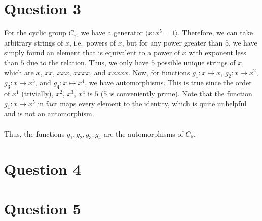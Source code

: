 \documentclass[letterpaper]{article}
\begin{document}
\section{Question 3}
\label{sec:Question3}

For the cyclic group $ C_5 $, we have a generator $ \langle x : x^5 = 1 \rangle $.
Therefore, we can take arbitrary strings of $ x $, i.e.\ powers of $ x $, but for any power greater than $ 5 $, we have simply found an element that is equivalent to a power of $ x $ with exponent less than $ 5 $ due to the relation.
Thus, we only have $ 5 $ possible unique strings of $ x $, which are $ x $, $ xx $, $ xxx $, $ xxxx $, and $ xxxxx $.
Now, for functions $ g_1 : x \mapsto x $, $ g_2 : x \mapsto x^2 $, $ g_3 : x \mapsto x^3 $, and $ g_4 : x \mapsto x^4 $, we have automorphisms.
This is true since the order of $ x^1 $ (trivially), $ x^2 $, $ x^3 $, $ x^4 $ is $ 5 $ ($ 5 $ is conveniently prime).
Note that the function $ g_1 : x \mapsto x^5 $ in fact maps every element to the identity, which is quite unhelpful and is not an automorphism.
\\ \\
Thus, the functions $ g_1, g_2, g_3, g_4 $ are the automorphisms of $ C_5 $.

\section{Question 4}
\label{sec:Question4}

\vspace{40 mm}

\section{Question 5}
\label{sec:Question5}
\end{document}
